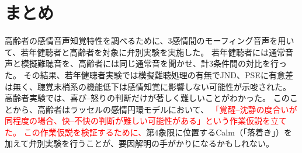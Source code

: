 \section{まとめ}
高齢者の感情音声知覚特性を調べるために、3感情間のモーフィング音声を用いて、若年健聴者と高齢者を対象に弁別実験を実施した。
若年健聴者には通常音声と模擬難聴音を、高齢者には同じ通常音を聞かせ、計3条件間の対比を行った。
その結果、若年健聴者実験では模擬難聴処理の有無でJND、PSEに有意差は無く、聴覚末梢系の機能低下は感情知覚に影響しない可能性が示唆された。
高齢者実験では、喜び--怒りの判断だけが著しく難しいことがわかった。
このことから、高齢者はラッセルの感情円環モデル\cite{russell1980circumplex}において、
\textcolor{red}{「覚醒--沈静の度合いが同程度の場合、快--不快の判断が難しい可能性がある」という作業仮説を立てた。
この作業仮説を検証するために、}第4象限に位置するCalm（「落着き」）を加えて弁別実験を行うことが、要因解明の手がかりになるかもしれない。

